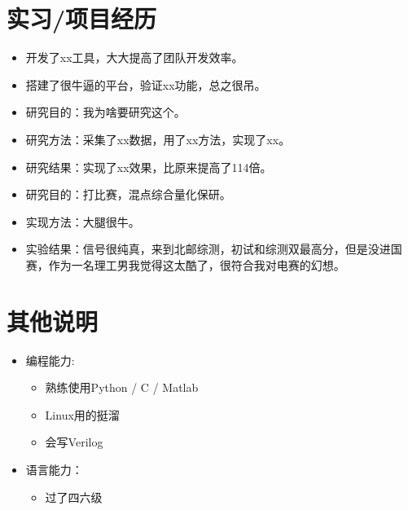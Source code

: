 \documentclass{resume}
\begin{document}
\section{\texorpdfstring{\faUsers}{} 实习/项目经历}

\begin{itemize}
  \item 开发了xx工具，大大提高了团队开发效率。
  \item 搭建了很牛逼的平台，验证xx功能，总之很吊。
\end{itemize}

\begin{itemize}
  \item 研究目的：我为啥要研究这个。
  \item 研究方法：采集了xx数据，用了xx方法，实现了xx。
  \item 研究结果：实现了xx效果，比原来提高了114倍。
\end{itemize}

\begin{itemize}
  \item 研究目的：打比赛，混点综合量化保研。
  \item 实现方法：大腿很牛。
  \item 实验结果：信号很纯真，来到北邮综测，初试和综测双最高分，但是没进国赛，作为一名理工男我觉得这太酷了，很符合我对电赛的幻想。
\end{itemize}



\section{\texorpdfstring{\faCogs}{} 其他说明}
\begin{itemize}[parsep=0.5ex]
  \item 编程能力: 
  \begin{itemize}
    \item 熟练使用Python / C / Matlab
    \item Linux用的挺溜
    \item 会写Verilog
  \end{itemize}
  \item 语言能力：
  \begin{itemize}
    \item 过了四六级
  \end{itemize}
\end{itemize}
\end{document}
